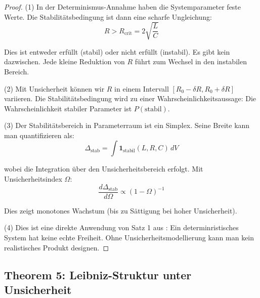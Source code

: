 \documentclass[a4paper, 12pt, twoside, openright]{report}
\theoremstyle{definition}
\theoremstyle{definition}
\begin{document}
\begin{proof}

(1) In der Determinismus-Annahme haben die Systemparameter feste Werte. Die Stabilitätsbedingung ist dann eine scharfe Ungleichung:
\begin{equation}
R > R_{\text{crit}} = 2\sqrt{\frac{L}{C}}
\end{equation}

Dies ist entweder erfüllt (stabil) oder nicht erfüllt (instabil). Es gibt kein dazwischen. Jede kleine Reduktion von $R$ führt zum Wechsel in den instabilen Bereich.

(2) Mit Unsicherheit können wir $R$ in einem Intervall $[R_0 - \delta R, R_0 + \delta R]$ variieren. Die Stabilitätsbedingung wird zu einer Wahrscheinlichkeitsaussage: Die Wahrscheinlichkeit stabiler Parameter ist $P(\text{stabil})$.

(3) Der Stabilitätsbereich in Parameterraum ist ein Simplex. Seine Breite kann man quantifizieren als:
\begin{equation}
\Delta_{\text{stab}} = \int \mathbf{1}_{\text{stabil}}(L, R, C) \, dV
\end{equation}

wobei die Integration über den Unsicherheitsbereich erfolgt. Mit Unsicherheitsindex $\Omega$:
\begin{equation}
\frac{d\Delta_{\text{stab}}}{d\Omega} \propto (1-\Omega)^{-1}
\end{equation}

Dies zeigt monotones Wachstum (bis zu Sättigung bei hoher Unsicherheit).

(4) Dies ist eine direkte Anwendung von Satz 1 aus \cite{epp_signal}: Ein determinristisches System hat keine echte Freiheit. Ohne Unsicherheitsmodellierung kann man kein realistisches Produkt designen.

\end{proof}

\subsection*{Theorem 5: Leibniz-Struktur unter Unsicherheit}
\end{document}
